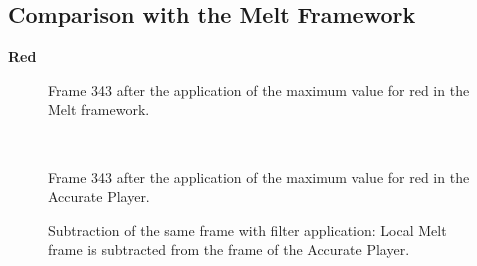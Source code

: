 \documentclass[../MasterThesis.tex]{subfiles}
\begin{document}
\vspace*{-0.4em}

\subsection*{Comparison with the Melt Framework}

\vspace*{-0.4em}


\textbf{Red}

\vspace*{-1.4em}

\begin{minipage}{0.48\textwidth}
	
	\begin{figure}[H]
		\begin{center}
			\caption{\small Frame 343 after the application of the maximum value for red in the Melt framework.}
		\end{center}
	\end{figure}
\end{minipage}\begin{minipage}{0.04\textwidth}
	\ 
\end{minipage}\begin{minipage}{0.48\textwidth}
	
	\begin{figure}[H]
		\begin{center}
			\caption[]{\small Frame 343 after the application of the maximum value for red in the Accurate Player.}
		\end{center}
	\end{figure}
\end{minipage}

\vspace*{-1em}

\begin{figure}[H]
	\begin{center}
		\caption[]{\small Subtraction of the same frame with filter application: Local Melt frame is subtracted from the frame of the Accurate Player.}
	\end{center}
\end{figure}
\end{document}
